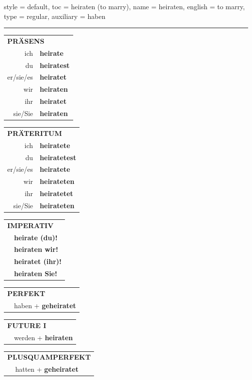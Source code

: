 \begin{verbentry}{
  style = {default},
  toc = {heiraten (to marry)},
  name = {heiraten},
  english = {to marry},
  type = {regular},
  auxiliary = {haben}
}
 

\vspace{5pt}
\hrule
\vspace{5pt}

\begin{tabular}{rl}
\multicolumn{2}{l}{\textbf{PRÄSENS}}\\
ich & \textbf{heirate}\\
du & \textbf{heiratest}\\
er/sie/es & \textbf{heiratet}\\
wir & \textbf{heiraten}\\
ihr & \textbf{heiratet}\\
sie/Sie & \textbf{heiraten}\\
\end{tabular}
\hfill
\begin{tabular}{rl}
\multicolumn{2}{l}{\textbf{PRÄTERITUM}}\\
ich & \textbf{heiratete}\\
du & \textbf{heiratetest}\\
er/sie/es & \textbf{heiratete}\\
wir & \textbf{heirateten}\\
ihr & \textbf{heiratetet}\\
sie/Sie & \textbf{heirateten}\\
\end{tabular}
\hfill
\begin{tabular}{rl}
\multicolumn{2}{l}{\textbf{IMPERATIV}}\\
& \textbf{heirate (du)!}\\
& \textbf{heiraten wir!}\\
& \textbf{heiratet (ihr)!}\\
& \textbf{heiraten Sie!}\\
\end{tabular}

\vspace{10pt}

\begin{tabular}{rl}
\multicolumn{2}{l}{\textbf{PERFEKT}}\\
& haben + \textbf{geheiratet}\\
\end{tabular}
\hfill
\begin{tabular}{rl}
\multicolumn{2}{l}{\textbf{FUTURE I}}\\
& werden + \textbf{heiraten}\\
\end{tabular}
\hfill
\begin{tabular}{rl}
\multicolumn{2}{l}{\textbf{PLUSQUAMPERFEKT}}\\
& hatten + \textbf{geheiratet}\\
\end{tabular}


\end{verbentry}
